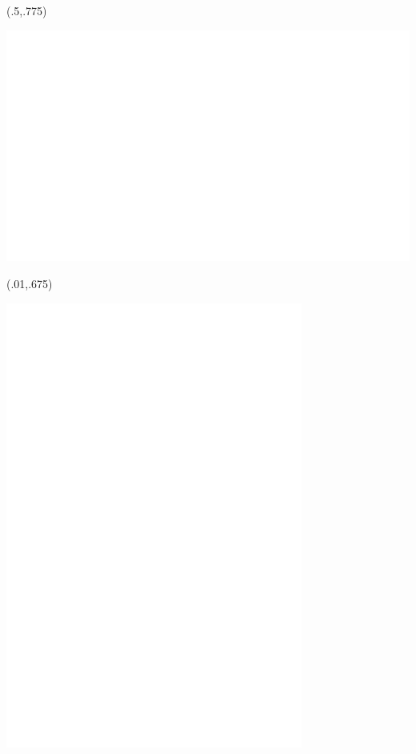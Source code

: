 \begin{textblock}{.45}(.5,.775)
	\begin{center}
		\includegraphics[width=.4\paperwidth]{images/frontpage2}
	\end{center}
\end{textblock}

\begin{textblock}{.4}(.01,.675)
	\begin{center}
		\includegraphics[width=.2\paperwidth]{images/frontpage1}
	\end{center}
\end{textblock}

